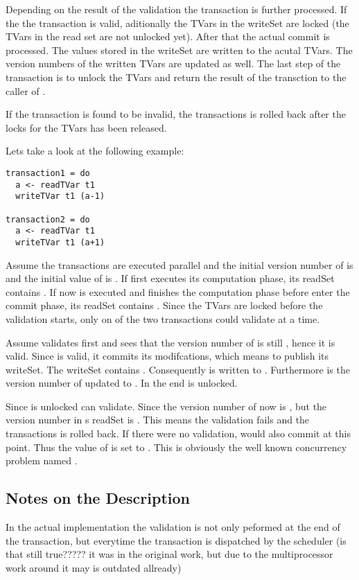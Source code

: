 Depending on the result of the validation the transaction is further processed. If the the transaction is valid, aditionally the
TVars in the writeSet are locked (the TVars in the read set are not unlocked yet). After that the actual commit is processed. 
The values stored in the writeSet are written to the acutal TVars. The version numbers of the written TVars are updated as well.
The last step of the transaction is to unlock the TVars and return the result of the transction to the caller of .

If the transaction is found to be invalid, the transactions is rolled back after the locks for the TVars has been released.


Lets take a look at the following example:
\begin{lstlisting}
transaction1 = do 
  a <- readTVar t1
  writeTVar t1 (a-1)
  
transaction2 = do 
  a <- readTVar t1
  writeTVar t1 (a+1)
\end{lstlisting}
Assume the transactions are executed parallel and the initial version number of  is  and the initial value of  is .
If  first executes its computation phase, its readSet contains . 
If now  is executed and finishes the computation phase before  enter the commit phase,
its readSet contains . Since the TVars are locked before the validation starts, only on 
of the two transactions could validate at a time. 

Assume  validates first and sees that the version number of 
is still , hence it is valid. Since  is valid, it commits its modifcations, which means to publish its writeSet.
The writeSet contains .  Consequently  is written to . Furthermore is the version number of  updated
to . In the end  is unlocked. 

Since  is unlocked  can validate. Since the version number of  now is , but the version
number in s readSet is . This means the validation fails and the transactions is rolled back. If there were 
no validation,  would also commit at this point. Thus the value of  is set to . This is obviously
the well known concurrency problem named . 


\subsection{Notes on the Description}
In the actual implementation the validation is not only peformed at the end of the transaction, but everytime the transaction is 
dispatched by the scheduler (is that still true????? it was in the original work, but due to the multiprocessor work around it may
is outdated allready)


